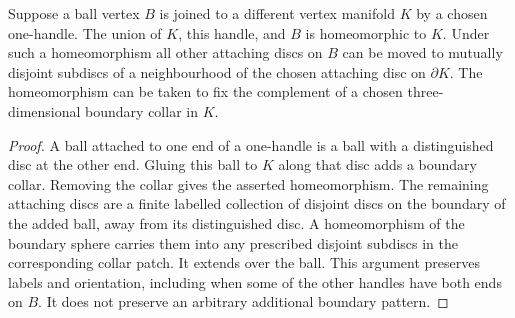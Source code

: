 \begin{lemma}
\label{lem:absorb-ball}
Suppose a ball vertex $B$ is joined to a different vertex manifold $K$ by
a chosen one-handle.  The union of $K$, this handle, and $B$ is
homeomorphic to $K$.  Under such a homeomorphism all other attaching discs
on $B$ can be moved to mutually disjoint subdiscs of a neighbourhood of
the chosen attaching disc on $\partial K$.  The homeomorphism can be taken
to fix the complement of a chosen three-dimensional boundary collar in $K$.
\end{lemma}
\begin{proof}
A ball attached to one end of a one-handle is a ball with a distinguished
disc at the other end.  Gluing this ball to $K$ along that disc adds a
boundary collar.  Removing the collar gives the asserted homeomorphism.
The remaining attaching discs are a finite labelled collection of
disjoint discs on the boundary of the added ball, away from its
distinguished disc.  A homeomorphism of the boundary sphere carries
them into any prescribed disjoint subdiscs in the corresponding collar
patch.  It extends over the ball.  This argument preserves labels and
orientation, including when some of the other handles have both ends on
$B$.  It does not preserve an arbitrary additional boundary pattern.
\end{proof}

